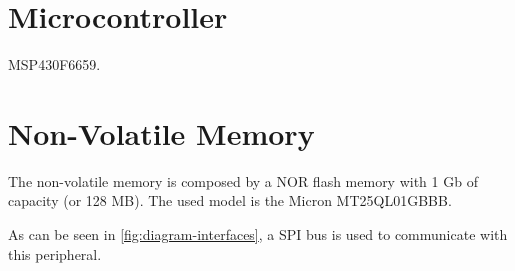 \section{Microcontroller}

MSP430F6659.

\section{Non-Volatile Memory}

The non-volatile memory is composed by a NOR flash memory with 1 Gb of capacity (or 128 MB). The used model is the Micron MT25QL01GBBB.

As can be seen in \autoref{fig:diagram-interfaces}, a SPI bus is used to communicate with this peripheral.
